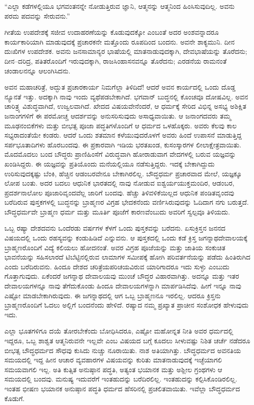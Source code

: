 “ಎಲ್ಲಾ ಕಡೆಗಳಲ್ಲಿಯೂ ಭಗವಂತನನ್ನೇ ನೋಡುತ್ತಿರುವ ಜ್ಞಾನಿ, ಆತ್ಮನನ್ನು ಆತ್ಮನಿಂದ ಹಿಂಸಿಸುವುದಿಲ್ಲ. ಅವನು ಪರಮ ಪದವನ್ನು ಸೇರುವನು.”

ಗೀತೆಯ ಉಪದೇಶಕ್ಕೆ ಸಜೀವ ಉದಾಹರಣೆಯನ್ನು ಕೊಡುವುದಕ್ಕೋ ಎಂಬಂತೆ ಅದರ ಅಂಶವನ್ನಾದರೂ ಕಾರ್ಯಕಾರಿಯಾಗಿ ಮಾಡುವುದಕ್ಕೆ ಪ್ರಚಾರಕನೇ ಮತ್ತೊಂದು ರೂಪದಿಂದ ಬಂದನು. ಅವನೇ ಶಾಕ್ಯಮುನಿ. ದೀನ ದುಃಖಿಗಳ ಉಪದೇಶಕ. ಅವನು ಜನಸಾಮಾನ್ಯರ ಭಾಷೆಯಲ್ಲಿ ಮಾತನಾಡುವುದಕ್ಕಾಗಿ, ದೇವಭಾಷೆಯನ್ನು ತೊರೆದನು; ದೀನ–ದರಿದ್ರ, ಪತಿತರೊಂದಿಗೆ ಇರುವುದಕ್ಕಾಗಿ, ರಾಜಸಿಂಹಾಸನವನ್ನೂ ತೊರೆದನು; ಎರಡನೆಯ ರಾಮನಂತೆ ಚಂಡಾಲನನ್ನೂ ಆಲಂಗಿಸಿದನು.

ಅವನ ಮಹಾಚರಿತ್ರೆ, ಅದ್ಭುತ ಪ್ರಚಾರಕಾರ್ಯ ನಿಮಗೆಲ್ಲಾ ತಿಳಿದಿದೆ! ಆದರೆ ಅವನ ಕಾರ್ಯದಲ್ಲಿ ಒಂದು ದೊಡ್ಡ ನ್ಯೂನತೆ ಇತ್ತು. ಅದಕ್ಕಾಗಿ ನಾವು ಇಂದು ವ್ಯಥೆಪಡಬೇಕಾಗಿದೆ. ಭಗವಾನ್​ ಬುದ್ಧನಲ್ಲಿ ಕೊಂಚವೂ ದೋಷವಿಲ್ಲ. ಅವನ ಚಾರಿತ್ರ್ಯ ವಿಶುದ್ಧವಾಗಿದೆ, ಉಜ್ವಲವಾಗಿದೆ. ಖೇದದ ವಿಷಯವೇನೆಂದರೆ, ಆ ಧರ್ಮಕ್ಕೆ ಸೇರಿದ ವಿಭಿನ್ನ ಅಸಭ್ಯ ಅಶಿಕ್ಷಿತ ಜನಾಂಗಗಳಿಗೆ ಈ ಪರಮೋಚ್ಚ ಆದರ್ಶವನ್ನು ಅನುಸರಿಸುವುದು ಅಸಾಧ್ಯವಾಯಿತು. ಆ ಜನಾಂಗದವರು ತಮ್ಮ ಮೂಢನಂಬಿಕೆಗಳು ಮತ್ತು ಬೀಭತ್ಸ ಪೂಜಾ ಪದ್ಧತಿಗಳೊಂದಿಗೆ ಆ ಧರ್ಮದ ಒಳಹೊಕ್ಕರು. ಅವರು ಕೆಲವು ಕಾಲ ಸಭ್ಯ\-ರಾದಂತೆಯೇ ಕಂಡರು. ಆದರೆ ಒಂದು ಶತಮಾನ ಕಳೆಯುವುದರೊಳಗೆ ಅವರು ಹಿಂದೆ ಉಪಾಸನೆ ಮಾಡುತ್ತಿದ್ದ ಸರ್ಪಭೂತಾದಿಗಳು ಹೊರಬಂದವು. ಈ ಪ್ರಕಾರವಾಗಿ ಇಡಿಯ ಭರತಖಂಡ, ಕುಸಂಸ್ಕಾರಗಳ ಲೀಲಾಕ್ಷೇತ್ರವಾಯಿತು. ಮೊದಮೊದಲು ಬಂದ ಬೌದ್ಧರು ಪ್ರಾಣಿಹಿಂಸೆಗೆ ವಿರುದ್ಧವಾಗಿ ಹೋರಾಡುವಾಗ ವೇದಗಳಲ್ಲಿ ಬರುವ ಯಜ್ಞವನ್ನು ಖಂಡಿಸಿದ್ದರು. ಈ ಯಜ್ಞವನ್ನು ಪ್ರತಿಯೊಂದು ಮನೆಯಲ್ಲಿಯೂ ನಡೆಸುತ್ತಿದ್ದರು. ಇದಕ್ಕೆ ಬೇಕಾಗಿದ್ದುದು ಉರಿಸುವುದಕ್ಕಷ್ಟು ಬೆಂಕಿ, ಹೆಚ್ಚಿನ ಆಡಂಬರವೇನೂ ಬೇಕಾಗಿರಲಿಲ್ಲ. ಬೌದ್ಧಧರ್ಮ ಪ್ರಚಾರವಾದ ಮೇಲೆ, ಯಜ್ಞಕ್ಕೂ ಲೋಪ ಬಂತು. ಅದರ ಬದಲು ಆಧುನಿಕ ಭಾರತದಲ್ಲಿ ನಾವು ನೋಡುವ ಐಶ್ವರ್ಯಯುಕ್ತಮಂದಿರ, ಆಡಂಬರ, ಪ್ರದರ್ಶನಾಲೋಲ ಪೂಜಾರಿವೃಂದವೆಲ್ಲ ಜಾರಿಗೆ ಬಂದವು. ಹೆಚ್ಚು ತಿಳಿವಳಿಕೆಯಿಲ್ಲದ ಆಧುನಿಕ ಪಂಡಿತವೃಂದವು ಬರೆದಿರುವ ಪುಸ್ತಕಗಳಲ್ಲಿ ಬುದ್ಧನನ್ನು ಬ್ರಾಹ್ಮಣರ ವಿಗ್ರಹ ಭೇದಕನೆಂದು ವರ್ಣಿಸಿರುವುದನ್ನು ಓದಿದಾಗ ನಗು ಬರುತ್ತದೆ. ಬೌದ್ಧಧರ್ಮವೇ ಬ್ರಾಹ್ಮಣ ಧರ್ಮ ಮತ್ತು ಮೂರ್ತಿ ಪೂಜೆಗೆ ಕಾರಣವೆಂಬುದು ಅವರಿಗೆ ಸ್ವಲ್ಪವೂ ತಿಳಿಯದು.

ಒಬ್ಬ ರಷ್ಯಾ ದೇಶದವನು ಒಂದೆರಡು ವರ್ಷಗಳ ಕೆಳಗೆ ಒಂದು ಪುಸ್ತಕವನ್ನು ಬರೆದನು. ಏಸುಕ್ರಿಸ್ತನ ಜನನದ ವಿಷಯದಲ್ಲಿ ಒಂದು ರಹಸ್ಯವನ್ನು ಕಂಡುಹಿಡಿದೆ ಎನ್ನುವನು. ಆ ಪುಸ್ತಕದಲ್ಲಿ ಒಂದು ಕಡೆ ಕ್ರಿಸ್ತ ಜಗನ್ನಾಥ\break ದೇವಾಲಯಕ್ಕೆ ಬ್ರಾಹ್ಮಣರೊಂದಿಗೆ ವಿದ್ಯೆ ಕಲಿಯಲು ಹೋದನಂತೆ. ಅವರ ವಿಗ್ರಹ ಪೂಜೆಯನ್ನು ಮತ್ತು ಜಾತಿಯ ಸಂಕುಚಿತ ಭಾವನೆಯನ್ನು ಸಹಿಸಲಾರದೆ ಟಿಬೆಟ್ಟಿನಲ್ಲಿರುವ ಲಾಮಾಗಳ ಸಮೀಪಕ್ಕೆ ಹೋಗಿ ಪರಿವರ್ತನೆಯನ್ನು ಪಡೆದು ಹಿಂತಿರುಗಿದ ಎಂದು ಬರೆದಿರುವನು. ಹಿಂದೂ ದೇಶದ ಚರಿತ್ರೆಯ\break ಪರಿಚಯವಿರುವ ಯಾರಿಗಾದರೂ ಇದು ಸುಳ್ಳು ಎಂಬುದು ಗೊತ್ತಾಗುವುದು. ಏಕೆಂದರೆ ಜಗನ್ನಾಥ ದೇವಾಲಯವು ಮುಂಚೆ ಬೌದ್ಧರ ವಿಹಾರವಾಗಿತ್ತು. ಅದನ್ನೂ ಮತ್ತು ಇತರ ದೇವಾಲಯಗಳನ್ನೂ ನಾವು ತೆಗೆದುಕೊಂಡು ಹಿಂದೂ ದೇವಾಲಯಗಳನ್ನಾಗಿ ಮಾರ್ಪಡಿಸಿದೆವು. ಹೀಗೆ ಇನ್ನೂ ನಾವು ಎಷ್ಟೋ ಮಾಡಬೇಕಾಗಿರುವುದು. ಈ ಜಗನ್ನಾಥದಲ್ಲಿ ಆಗ ಒಬ್ಬ ಬ್ರಾಹ್ಮಣನೂ ಇರಲಿಲ್ಲ. ಆದರೂ ಕ್ರಿಸ್ತನು ಬ್ರಾಹ್ಮಣರೊಂದಿಗೆ ಓದಲು ಅಲ್ಲಿಗೆ ಬಂದನೆಂದು ಹೇಳಿದೆ. ರಷ್ಯಾದ ನಮ್ಮ ಪ್ರಖ್ಯಾತ ಪ್ರಾಚೀನ ಸಂಶೋಧಕ ಹೇಳುವುದು ಇದು.

ಎಲ್ಲಾ ಭೂತಗಳಿಗೂ ದಯೆ ತೋರಬೇಕೆಂದು ಬೋಧಿಸಿದರೂ, ಎಷ್ಟೋ ಮಹೋನ್ನತ ನೀತಿ ಅವರ ಧರ್ಮದಲ್ಲಿ ಇದ್ದರೂ, ಒಬ್ಬ ಶಾಶ್ವತ ಆತ್ಮನಿರುವನೇ ಇಲ್ಲವೇ ಎಂಬ ವಿಷಯದ ಬಗ್ಗೆ ಕೂದಲು ಸೀಳುವಷ್ಟು ನಿಶಿತ ಚರ್ಚೆ ನಡೆದರೂ ಬೀಭತ್ಸ ಬೌದ್ಧಧರ್ಮದ ಸೌಧವು ಕುಸಿದು ನುಚ್ಚು ನೂರಾಯಿತು. ನಾಶ ಅತಿಯಾಗಿತ್ತು. ಬೌದ್ಧಧರ್ಮದ ಅವನತಿಯ ಸಮಯದಲ್ಲಿ ಇದ್ದ ಹೀನ ಆಚಾರ ವ್ಯವಹಾರಗಳ ವಿಷಯವನ್ನು ಕುರಿತು ಮಾತನಾಡುವುದಕ್ಕೆ ಇಚ್ಛೆಯಾಗಲಿ ಸಮಯವಾಗಲಿ ಇಲ್ಲ. ಅತಿ ಕುತ್ಸಿತ ಅನುಷ್ಠಾನ ಪದ್ಧತಿ, ಅತ್ಯಂತ ಭಯಾನಕ ಮತ್ತು ಅಶ್ಲೀಲ ಗ್ರಂಥಗಳು ಆ ಸಮಯದಲ್ಲಿ ಬಂದವು. ಮನುಷ್ಯ ಇದುವರೆಗೆ ಇಂತಹುದನ್ನು ಬರೆದಿರಲಿಲ್ಲ. ಇಂತಹುದನ್ನು ಕಲ್ಪಿಸಿಕೊಂಡಿರಲಿಲ್ಲ. ಇಂತಹ ಭೀಷಣ ಭಯಾನಕ ಅನುಷ್ಠಾನ ಪದ್ಧತಿ ಧರ್ಮದ ಹೆಸರಿನಲ್ಲಿ ಪ್ರಚಲಿತವಾಯಿತು. ಇವೆಲ್ಲಾ ಬೌದ್ಧಧರ್ಮದ ಕೊಡುಗೆ.

